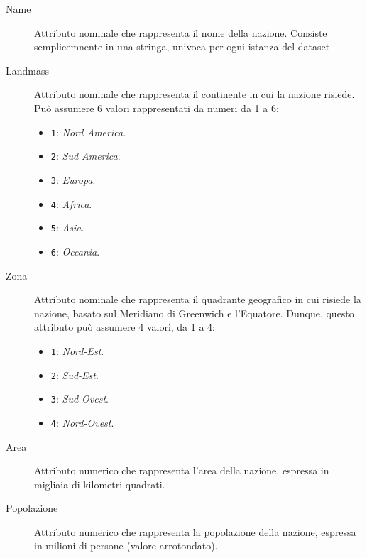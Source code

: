 \documentclass[a4paper,11pt,twoside,notitlepage,final]{scrartcl}
\begin{document}
\begin{description}
  \item[Name]
    Attributo nominale che rappresenta il nome della nazione.
    Consiste semplicemnente in una stringa, univoca per ogni istanza del dataset

  \item[Landmass]
    Attributo nominale che rappresenta il continente in cui la nazione risiede.
    Può assumere 6 valori rappresentati da numeri da 1 a 6:
    \begin{itemize}
      \item \texttt{1}: \emph{Nord America}.
      \item \texttt{2}: \emph{Sud America}.
      \item \texttt{3}: \emph{Europa}.
      \item \texttt{4}: \emph{Africa}.
      \item \texttt{5}: \emph{Asia}.
      \item \texttt{6}: \emph{Oceania}.
    \end{itemize}

  \item[Zona]
    Attributo nominale che rappresenta il quadrante geografico in cui risiede la nazione, basato sul Meridiano di Greenwich e l'Equatore.
    Dunque, questo attributo può assumere 4 valori, da 1 a 4:
    \begin{itemize}
      \item \texttt{1}: \emph{Nord-Est}.
      \item \texttt{2}: \emph{Sud-Est}.
      \item \texttt{3}: \emph{Sud-Ovest}.
      \item \texttt{4}: \emph{Nord-Ovest}.
    \end{itemize}

  \item[Area]
    Attributo numerico che rappresenta l'area della nazione, espressa in migliaia di kilometri quadrati.

  \item[Popolazione]
    Attributo numerico che rappresenta la popolazione della nazione, espressa in milioni di persone (valore arrotondato).


\end{description}
\end{document}

